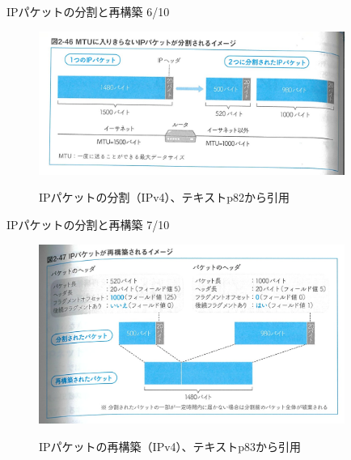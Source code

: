 \documentclass[12pt,aspectratio=169]{beamer}
\begin{document}
\begin{frame}{IPパケットの分割と再構築 6/10}

  \begin{figure}
    \centering
    \includegraphics[width=10cm,bb=0 0 1440 675]{figures/ip_fragm1.png}
    \label{fig:ip_fragm1}
    \caption{IPパケットの分割（IPv4）、テキストp82から引用}
  \end{figure}

\end{frame}

\begin{frame}{IPパケットの分割と再構築 7/10}

  \begin{figure}
    \centering
    \includegraphics[width=10cm,bb=0 0 1090 640]{figures/ip_fragm2.png}
    \label{fig:ip_fragm2}
    \caption{IPパケットの再構築（IPv4）、テキストp83から引用}
  \end{figure}

\end{frame}
\end{document}
